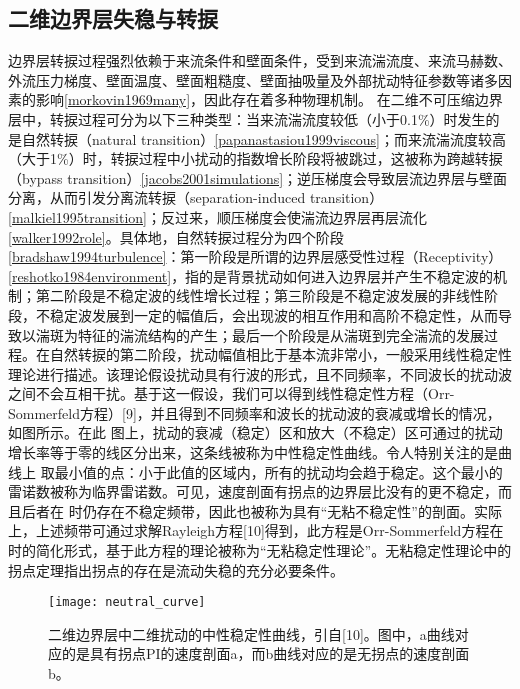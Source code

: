 \subsection{二维边界层失稳与转捩}
边界层转捩过程强烈依赖于来流条件和壁面条件，受到来流湍流度、来流马赫数、外流压力梯度、壁面温度、壁面粗糙度、壁面抽吸量及外部扰动特征参数等诸多因素的影响\ref{morkovin1969many}，因此存在着多种物理机制。
在二维不可压缩边界层中，转捩过程可分为以下三种类型：当来流湍流度较低（小于0.1\%）时发生的是自然转捩（natural transition）\ref{papanastasiou1999viscous}；而来流湍流度较高（大于1\%）时，转捩过程中小扰动的指数增长阶段将被跳过，这被称为跨越转捩（bypass transition）\ref{jacobs2001simulations}；逆压梯度会导致层流边界层与壁面分离，从而引发分离流转捩（separation-induced transition）\ref{malkiel1995transition}；反过来，顺压梯度会使湍流边界层再层流化\ref{walker1992role}。具体地，自然转捩过程分为四个阶段\ref{bradshaw1994turbulence}：第一阶段是所谓的边界层感受性过程（Receptivity）\ref{reshotko1984environment}，指的是背景扰动如何进入边界层并产生不稳定波的机制；第二阶段是不稳定波的线性增长过程；第三阶段是不稳定波发展的非线性阶段，不稳定波发展到一定的幅值后，会出现波的相互作用和高阶不稳定性，从而导致以湍斑为特征的湍流结构的产生；最后一个阶段是从湍斑到完全湍流的发展过程。在自然转捩的第二阶段，扰动幅值相比于基本流非常小，一般采用线性稳定性理论进行描述。该理论假设扰动具有行波的形式，且不同频率，不同波长的扰动波之间不会互相干扰。基于这一假设，我们可以得到线性稳定性方程（Orr-Sommerfeld方程）[9]，并且得到不同频率和波长的扰动波的衰减或增长的情况，如图\cite{f:neutral_curve}所示。在此 图上，扰动的衰减（稳定）区和放大（不稳定）区可通过的扰动增长率等于零的线区分出来，这条线被称为中性稳定性曲线。令人特别关注的是曲线上 取最小值的点：小于此值的区域内，所有的扰动均会趋于稳定。这个最小的雷诺数被称为临界雷诺数。可见，速度剖面有拐点的边界层比没有的更不稳定，而且后者在 时仍存在不稳定频带，因此也被称为具有“无粘不稳定性”的剖面。实际上，上述频带可通过求解Rayleigh方程[10]得到，此方程是Orr-Sommerfeld方程在 时的简化形式，基于此方程的理论被称为“无粘稳定性理论”。无粘稳定性理论中的拐点定理指出拐点的存在是流动失稳的充分必要条件。
\begin{figure}
  \centering
  \texttt{[image: neutral\_curve]}
  \caption{二维边界层中二维扰动的中性稳定性曲线，引自[10]。图中，a曲线对应的是具有拐点PI的速度剖面a，而b曲线对应的是无拐点的速度剖面b。}\label{f:neutral_curve}
\end{figure}

